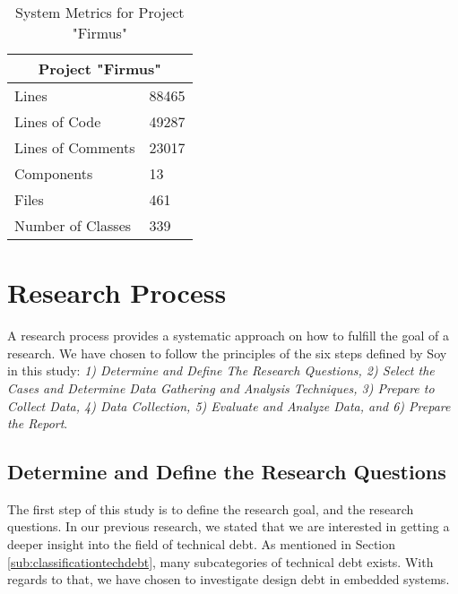 \begin{table}[]
\centering
\caption{System Metrics for Project "Firmus"}
\label{tab:systemmetrics}
\begin{tabular}{|l|l|}
\multicolumn{2}{c}{\textbf{Project "Firmus"}} \\ \hline
Lines                      & 88465          \\ \hline
Lines of Code              & 49287          \\ \hline
Lines of Comments          & 23017          \\ \hline
Components                 & 13             \\ \hline
Files                      & 461            \\ \hline
Number of Classes          & 339           \\ \hline
\end{tabular}
\end{table}




% 


\section{Research Process}
\label{sec:researchprocess}
A research process provides a systematic approach on how to fulfill the goal of a research. We have chosen to follow the principles of the six steps defined by Soy\cite{soysusan} in this study: \textit{1) Determine and Define The Research Questions, 2) Select the Cases and Determine Data Gathering and Analysis Techniques, 3) Prepare to Collect Data, 4) Data Collection, 5) Evaluate and Analyze Data, and 6) Prepare the Report}.


\subsection{Determine and Define the Research Questions} %
\label{subsec:rq}
The first step of this study is to define the research goal, and the research questions. In our previous research\cite{forprosjekt}, we stated that we are interested in getting a deeper insight into the field of technical debt. As mentioned in Section \ref{sub:classificationtechdebt}, many subcategories of technical debt exists. With regards to that, we have chosen to investigate design debt in embedded systems.


